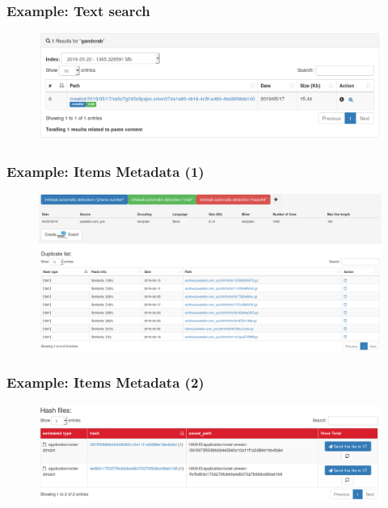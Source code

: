 \documentclass{beamer}
\begin{document}
\begin{frame}
    \frametitle{Example: Text search}
    \begin{figure}
        \includegraphics[scale=0.3, angle=0]{images/ail_02.png}
    \end{figure}
\end{frame}

\begin{frame}
    \frametitle{Example: Items Metadata (1)}
    \begin{figure}
        \includegraphics[scale=0.21, angle=0]{images/ail_15.png}
    \end{figure}
\end{frame}

\begin{frame}
    \frametitle{Example: Items Metadata (2)}
    \begin{figure}
        \includegraphics[scale=0.28, angle=0]{images/ail_16.png}
    \end{figure}
\end{frame}
\end{document}
